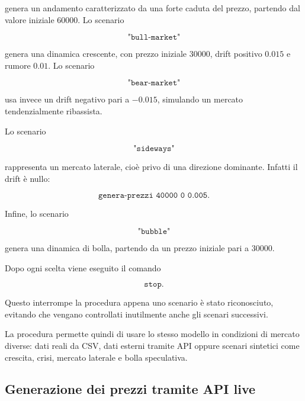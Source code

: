genera un andamento caratterizzato da una forte caduta del prezzo, partendo dal
valore iniziale \(60000\). Lo scenario

\[
\texttt{"bull-market"}
\]

genera una dinamica crescente, con prezzo iniziale \(30000\), drift positivo
\(0.015\) e rumore \(0.01\). Lo scenario

\[
\texttt{"bear-market"}
\]

usa invece un drift negativo pari a \(-0.015\), simulando un mercato
tendenzialmente ribassista.

Lo scenario

\[
\texttt{"sideways"}
\]

rappresenta un mercato laterale, cioè privo di una direzione dominante. Infatti
il drift è nullo:

\[
\texttt{genera-prezzi 40000 0 0.005}.
\]

Infine, lo scenario

\[
\texttt{"bubble"}
\]

genera una dinamica di bolla, partendo da un prezzo iniziale pari a \(30000\).

Dopo ogni scelta viene eseguito il comando

\[
\texttt{stop}.
\]

Questo interrompe la procedura appena uno scenario è stato riconosciuto, evitando
che vengano controllati inutilmente anche gli scenari successivi.

La procedura permette quindi di usare lo stesso modello in condizioni di mercato
diverse: dati reali da CSV, dati esterni tramite API oppure scenari sintetici
come crescita, crisi, mercato laterale e bolla speculativa.

\subsection{Generazione dei prezzi tramite API live}

